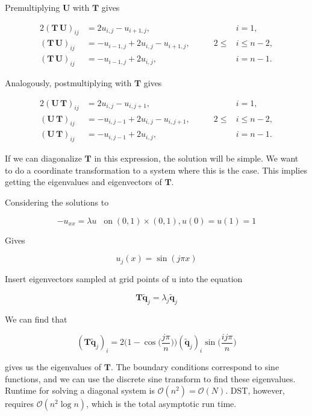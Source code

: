 Premultiplying $\mathbf{U}$ with $\mathbf{T}$ gives

\begin{alignat*}{2}
  (\mathbf{{T}} \, \mathbf{{U}})_{ij} &= 2u_{i,j} - u_{i+1,j}, &\qquad &i=1, \\
  (\mathbf{{T}} \, \mathbf{{U}})_{ij} &= -u_{i-1,j}+2u_{i,j} - u_{i+1,j}, &\qquad 2 \leq &i \leq n-2, \\
  (\mathbf{{T}} \, \mathbf{{U}})_{ij} &= -u_{i-1,j}+2u_{i,j}, &\qquad &i=n-1.
\end{alignat*}

Analogously, postmultiplying with $\mathbf{T}$ gives

\begin{alignat*}{2}
  (\mathbf{{U}} \, \mathbf{{T}})_{ij} &= 2u_{i,j} - u_{i,j+1}, &\qquad &i=1, \\
  (\mathbf{{U}} \, \mathbf{{T}})_{ij} &= -u_{i,j-1}+2u_{i,j} - u_{i,j+1}, &\qquad 2 \leq &i \leq n-2, \\
  (\mathbf{{U}} \, \mathbf{{T}})_{ij} &= -u_{i,j-1}+2u_{i,j}, &\qquad &i=n-1.
\end{alignat*}

If we can diagonalize $\mathbf{T}$ in this expression, the solution will be simple. We want to do a coordinate transformation to a system where this is the case. This implies getting the eigenvalues and eigenvectors of $\mathbf{T}$.

Considering the solutions to

\begin{equation}
  -u_{xx} = \lambda u \;\;\; \mathrm{on} \; (0, 1) \times (0, 1), u(0) = u(1) = 1
\end{equation}

Gives

\begin{equation}
  u_j(x) = \sin(j \pi x)
\end{equation}

Insert eigenvectors sampled at grid points of u into the equation

\begin{equation}
  \mathbf{T} \tilde{\mathbf{q}}_j = \lambda_j \tilde{\mathbf{q}}_j
\end{equation}

We can find that

\begin{equation}
  (\mathbf{{T}} \mathbf{\widetilde{q}}_j)_i = {{2 \biggl(1-\cos \biggl( \frac{j \pi}{n} \biggr) \biggr) }} {(\mathbf{\widetilde{q}}_j)_i}{{\sin \biggl( \frac{ij \pi}{n}\biggr)}}
\end{equation}

gives us the eigenvalues of $\mathbf{T}$. The boundary conditions correspond to sine functions, and we can use the discrete sine transform to find these eigenvalues. Runtime for solving a diagonal system is $\mathcal{O}(n^2) = \mathcal{O}(N)$. DST, however, requires $\mathcal{O}(n^2 \log n)$, which is the total asymptotic run time.

